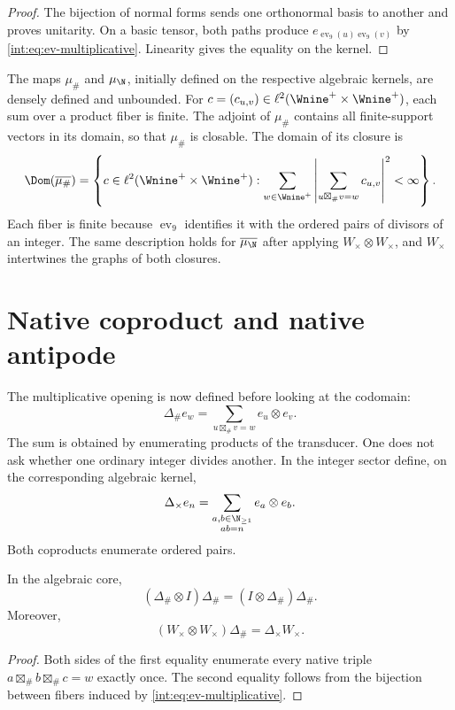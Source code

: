 \begin{proof}
The bijection of normal forms sends one orthonormal basis to another and proves
unitarity. On a basic tensor, both paths produce
$e_{\operatorname{ev}_9(u)\operatorname{ev}_9(v)}$ by
\eqref{int:eq:ev-multiplicative}. Linearity gives the equality on the kernel.
\end{proof}

The maps $\mu_\#$ and $\mu_{\N}$, initially defined on the respective
algebraic kernels, are densely defined and unbounded. For
\(c=(c_{u,v})\in\ell^2(\Wnine^+\times\Wnine^+)\), each sum over a product fiber
is finite. The adjoint of \(\mu_\#\) contains all finite-support vectors
in its domain, so that \(\mu_\#\) is closable. The domain of its
closure is
\[
 \Dom(\overline{\mu_\#})=
 \left\{c\in\ell^2(\Wnine^+\times\Wnine^+):
 \sum_{w\in\Wnine^+}
 \left|\sum_{u\boxtimes_\#v=w}c_{u,v}\right|^2<\infty
 \right\}.
\]
Each fiber is finite because $\operatorname{ev}_9$ identifies it with the ordered
pairs of divisors of an integer. The same description holds for
\(\overline{\mu_{\N}}\) after applying \(W_\times\otimes W_\times\), and
$W_\times$ intertwines the graphs of both closures.

\section{Native coproduct and native antipode}

The multiplicative opening is now defined before looking at the codomain:
\[
 \Delta_\#e_w
 =\sum_{u\boxtimes_\#v=w}e_u\otimes e_v.
\]
The sum is obtained by enumerating products of the transducer. One does not ask whether
one ordinary integer divides another.
In the integer sector define, on the corresponding algebraic kernel,
\[
 \Delta_\times e_n
 =\sum_{\substack{a,b\in\N_{\geq1}\\ab=n}}e_a\otimes e_b.
\]
Both coproducts enumerate ordered pairs.

\begin{theorem}
In the algebraic core,
\[
 (\Delta_\#\otimes I)\Delta_\#
 =(I\otimes\Delta_\#)\Delta_\#.
\]
Moreover,
\[
 (W_\times\otimes W_\times)\Delta_\#
 =\Delta_\times W_\times.
\]
\end{theorem}

\begin{proof}
Both sides of the first equality enumerate every native triple
$a\boxtimes_\#b\boxtimes_\#c=w$ exactly once. The second equality follows from the bijection
between fibers induced by \eqref{int:eq:ev-multiplicative}.
\end{proof}


